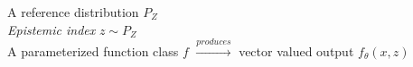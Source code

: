 \documentclass[preview]{standalone}
\begin{document}
A reference distribution  $P_Z$\\\textit{Epistemic index} $z \sim P_Z$\\A parameterized function class $f$ $\xrightarrow{produces}$ vector valued output $f_\theta(x, z)$\\
\end{document}
